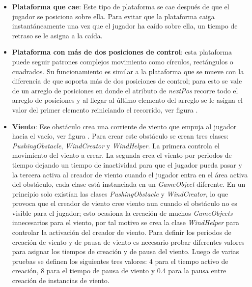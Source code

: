 \begin{itemize}
        \item \textbf{Plataforma que cae}: Este tipo de plataforma se cae después de
        que el jugador se posiciona sobre ella. Para evitar que la plataforma caiga
        instantáneamente una vez que el jugador ha caído sobre ella, un tiempo de
        retraso se le asigna a la caída.

        \item \textbf{Plataforma con más de dos posiciones de control}: esta plataforma
        puede seguir patrones complejos movimiento como círculos, rectángulos o
        cuadrados. Su funcionamiento es similar a la plataforma que se mueve con la
        diferencia de que soporta más de dos posiciones de control; para esto se vale
        de un arreglo de posiciones en donde el atributo de \textit{nextPos} recorre
        todo el arreglo de posiciones y al llegar al último elemento del arreglo se
        le asigna el valor del primer elemento reiniciando el recorrido, ver figura .

        \item \textbf{Viento}: Ese obstáculo crea una corriente de viento que empuja
        al jugador hacia el vacío, ver figura . Para crear este obstáculo se crean
        tres clases: \textit{PushingObstacle}, \textit{WindCreator} y
        \textit{WindHelper}. La primera controla el movimiento del viento a crear.
        La segunda crea el viento por periodos de tiempo dejando un tiempo de
        inactividad para que el jugador pueda pasar y la tercera activa al creador
        de viento cuando el jugador entra en el área activa del obstáculo, cada clase
        está instanciada en un \textit{GameObject} diferente. En un principio solo
        existían las clases \textit{PushingObstacle} y \textit{WindCreator}, lo que
        provoca que el creador de viento cree viento aun cuando el obstáculo no es
        visible para el jugador; esto ocasiona la creación de muchos
        \textit{GameObjects} innecesarios para el viento, por tal motivo se crea la
        clase \textit{WindHelper} para controlar la activación del
        creador de viento.  Para definir los periodos de creación de viento y de pausa
        de viento es necesario probar diferentes valores para asignar los tiempos de
        creación y de pausa del viento. Luego de varias pruebas se definen los
        siguientes tres valores: 4 para el tiempo activo de creación, 8 para el tiempo
        de pausa de viento y 0.4 para la pausa entre creación de instancias de viento.


\end{itemize}
